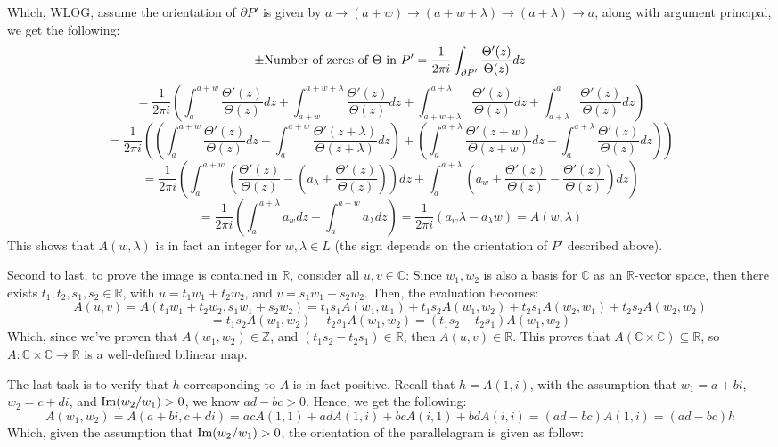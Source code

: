 \documentclass{article}
\begin{document}
\begin{itemize}
\begin{itemize}
        Which, WLOG, assume the orientation of $\partial P'$ is given by $a\rightarrow (a+w)\rightarrow (a+w+\lambda)\rightarrow (a+\lambda)\rightarrow a$, along with argument principal, we get the following:
        $$\pm\textmd{Number of zeros of } \Theta \textmd{ in } P' = \frac{1}{2\pi i}\int_{\partial P'}\frac{\Theta'(z)}{\Theta(z)}dz$$
        $$ = \frac{1}{2\pi i}\left(\int_{a}^{a+w}\frac{\Theta'(z)}{\Theta(z)}dz+\int_{a+w}^{a+w+\lambda}\frac{\Theta'(z)}{\Theta(z)}dz+\int_{a+w+\lambda}^{a+\lambda}\frac{\Theta'(z)}{\Theta(z)}dz+\int_{a+\lambda}^{a}\frac{\Theta'(z)}{\Theta(z)}dz\right)$$
        $$=\frac{1}{2\pi i}\left(\left(\int_{a}^{a+w}\frac{\Theta'(z)}{\Theta(z)}dz - \int_{a}^{a+w}\frac{\Theta'(z+\lambda)}{\Theta(z+\lambda)}dz\right)+\left(\int_{a}^{a+\lambda}\frac{\Theta'(z+w)}{\Theta(z+w)}dz - \int_{a}^{a+\lambda}\frac{\Theta'(z)}{\Theta(z)}dz\right)\right)$$
        $$=\frac{1}{2\pi i}\left(\int_{a}^{a+w}\left(\frac{\Theta'(z)}{\Theta(z)}-\left(a_\lambda+\frac{\Theta'(z)}{\Theta(z)}\right)\right)dz + \int_{a}^{a+\lambda}\left(a_w+\frac{\Theta'(z)}{\Theta(z)}-\frac{\Theta'(z)}{\Theta(z)}\right)dz\right)$$
        $$ = \frac{1}{2\pi i}\left(\int_{a}^{a+\lambda}a_wdz - \int_{a}^{a+w}a_\lambda dz\right) = \frac{1}{2\pi i}(a_w\lambda - a_\lambda w) = A(w,\lambda)$$
        This shows that $A(w,\lambda)$ is in fact an integer for $w,\lambda\in L$ (the sign depends on the orientation of $P'$ described above).
    \end{itemize}

    Second to last, to prove the image is contained in $\mathbb{R}$, consider all $u,v\in\mathbb{C}$: Since $w_1,w_2$ is also a basis for $\mathbb{C}$ as an $\mathbb{R}$-vector space, then there exists $t_1,t_2,s_1,s_2\in\mathbb{R}$, with $u=t_1w_1+t_2w_2$, and $v=s_1w_1+s_2w_2$. Then, the evaluation becomes:
    $$A(u,v)=A(t_1w_1+t_2w_2,s_1w_1+s_2w_2) = t_1s_1A(w_1,w_1)+t_1s_2A(w_1,w_2)+t_2s_1A(w_2,w_1)+t_2s_2A(w_2,w_2)$$
    $$ = t_1s_2A(w_1,w_2)-t_2s_1A(w_1,w_2)=(t_1s_2-t_2s_1)A(w_1,w_2)$$
    Which, since we've proven that $A(w_1,w_2)\in\mathbb{Z}$, and $(t_1s_2-t_2s_1)\in\mathbb{R}$, then $A(u,v)\in\mathbb{R}$. This proves that $A(\mathbb{C}\times\mathbb{C})\subseteq \mathbb{R}$, so $A:\mathbb{C}\times\mathbb{C}\rightarrow\mathbb{R}$ is a well-defined bilinear map.

    \hfil

    The last task is to verify that $h$ corresponding to $A$ is in fact positive. Recall that $h=A(1,i)$, with the assumption that $w_1=a+bi$, $w_2=c+di$, and $\textmd{Im}(w_2/w_1)>0$, we know $ad-bc > 0$. Hence, we get the following:
    $$A(w_1,w_2) =A(a+bi,c+di) = acA(1,1)+adA(1,i)+bcA(i,1)+bdA(i,i) = (ad-bc)A(1,i) = (ad-bc)h$$
    Which, given the assumption that $\textmd{Im}(w_2/w_1)>0$, the orientation of the parallelagram is given as follow:


\end{itemize}
\end{document}
